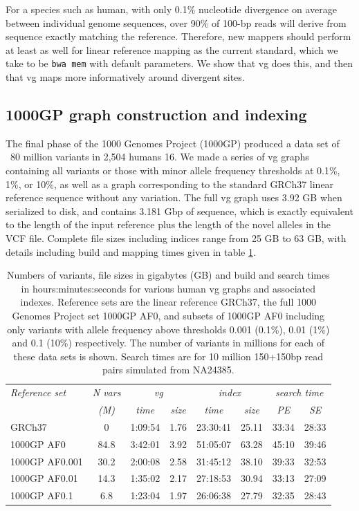 For a species such as human, with only 0.1\% nucleotide divergence on average between individual genome sequences, over 90\% of 100-bp reads will derive from sequence exactly matching the reference.
Therefore, new mappers should perform at least as well for linear reference mapping as the current standard, which we take to be {\tt bwa mem} with default parameters.
We show that vg does this, and then that vg maps more informatively around divergent sites.

\subsection{1000GP graph construction and indexing}

The final phase of the 1000 Genomes Project (1000GP) produced a data set of ~80 million variants in 2,504 humans 16.
We made a series of vg graphs containing all variants or those with minor allele frequency thresholds at 0.1\%, 1\%, or 10\%, as well as a graph corresponding to the standard GRCh37 linear reference sequence without any variation.
The full vg graph uses 3.92 GB when serialized to disk, and contains 3.181 Gbp of sequence, which is exactly equivalent to the length of the input reference plus the length of the novel alleles in the VCF file.
Complete file sizes including indices range from 25 GB to 63 GB, with details including build and mapping times given in table \ref{table:1000GP}.

\begin{table}[h]
\begin{tabular}{l||c|cc|cc|cc}
\itshape Reference set & \itshape N vars & \multicolumn{2}{c}{\itshape vg} & \multicolumn{2}{c}{\itshape index} & \multicolumn{2}{c}{\itshape search time}\\
& \itshape (M) & \itshape time & \itshape size & \itshape time & \itshape size & \itshape  PE & \itshape SE\\
\hline
GRCh37 & 0 & 1:09:54 & 1.76 & 23:30:41 & 25.11 & 33:34 & 28:33 \\
1000GP AF0 & 84.8 & 3:42:01 & 3.92 & 51:05:07 & 63.28 & 45:10 & 39:46 \\
1000GP AF0.001 & 30.2 & 2:00:08 & 2.58 & 31:45:12 & 38.10 & 39:33 & 32:53 \\
1000GP AF0.01 & 14.3 & 1:35:02 & 2.17 & 27:18:53 & 30.94 & 33:13 & 27:09\\
1000GP AF0.1 & 6.8 & 1:23:04 & 1.97 & 26:06:38 & 27.79 & 32:35 & 28:43 \\
\hline
\end{tabular}
\caption[1000GP variation graphs]{Numbers of variants, file sizes in gigabytes (GB) and build and search times in hours:minutes:seconds for various human vg graphs and associated indexes. Reference sets are the linear reference GRCh37, the full 1000 Genomes Project set 1000GP AF0, and subsets of 1000GP AF0 including only variants with allele frequency above thresholds 0.001 (0.1\%), 0.01 (1\%) and 0.1 (10\%) respectively.  The number of variants in millions for each of these data sets is shown.  Search times are for 10 million 150+150bp read pairs simulated from NA24385.
}
\label{table:1000GP}
\end{table}

